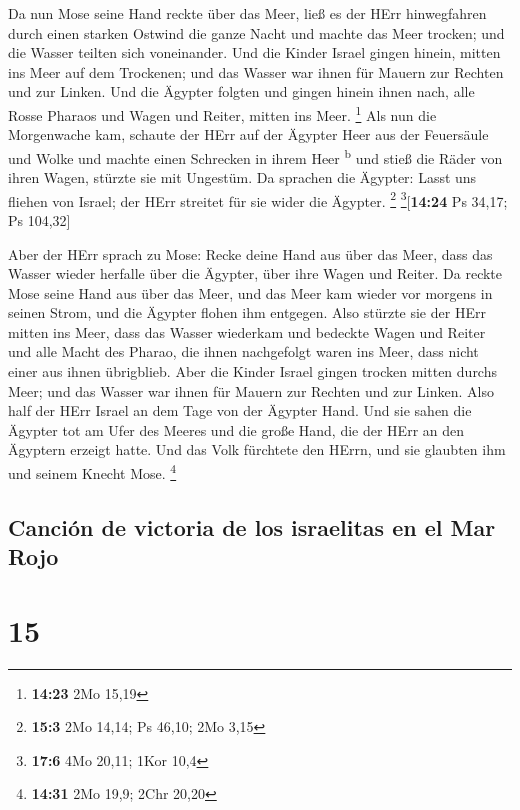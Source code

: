 Da nun Mose seine Hand reckte über das Meer, ließ es der
HErr hinwegfahren durch einen starken Ostwind die ganze Nacht und machte
das Meer trocken; und die Wasser teilten sich voneinander.
 Und die Kinder Israel gingen hinein, mitten ins Meer auf
dem Trockenen; und das Wasser war ihnen für Mauern zur Rechten und zur
Linken.  Und die Ägypter folgten und gingen hinein ihnen
nach, alle Rosse Pharaos und Wagen und Reiter, mitten ins Meer.
\footnote{\textbf{14:23} 2Mo 15,19}  Als nun die
Morgenwache kam, schaute der HErr auf der Ägypter Heer aus der
Feuersäule und Wolke und machte einen Schrecken in ihrem Heer
\textsuperscript{b}  und stieß die Räder von ihren Wagen,
stürzte sie mit Ungestüm. Da sprachen die Ägypter: Lasst uns fliehen von
Israel; der HErr streitet für sie wider die Ägypter. \footnote{\textbf{15:3}
  2Mo 14,14; Ps 46,10; 2Mo 3,15} \footnote{\textbf{17:6} 4Mo 20,11; 1Kor
  10,4}{[}\textbf{14:24} Ps 34,17; Ps 104,32{]}

 Aber der HErr sprach zu Mose: Recke deine Hand aus über
das Meer, dass das Wasser wieder herfalle über die Ägypter, über ihre
Wagen und Reiter.  Da reckte Mose seine Hand aus über das
Meer, und das Meer kam wieder vor morgens in seinen Strom, und die
Ägypter flohen ihm entgegen. Also stürzte sie der HErr mitten ins Meer,
 dass das Wasser wiederkam und bedeckte Wagen und Reiter
und alle Macht des Pharao, die ihnen nachgefolgt waren ins Meer, dass
nicht einer aus ihnen übrigblieb.  Aber die Kinder Israel
gingen trocken mitten durchs Meer; und das Wasser war ihnen für Mauern
zur Rechten und zur Linken.  Also half der HErr Israel an
dem Tage von der Ägypter Hand. Und sie sahen die Ägypter tot am Ufer des
Meeres  und die große Hand, die der HErr an den Ägyptern
erzeigt hatte. Und das Volk fürchtete den HErrn, und sie glaubten ihm
und seinem Knecht Mose. \footnote{\textbf{14:31} 2Mo 19,9; 2Chr 20,20}

\hypertarget{canciuxf3n-de-victoria-de-los-israelitas-en-el-mar-rojo}{%
\subsection{Canción de victoria de los israelitas en el Mar
Rojo}\label{canciuxf3n-de-victoria-de-los-israelitas-en-el-mar-rojo}}

\hypertarget{section-14}{%
\section{15}\label{section-14}}

